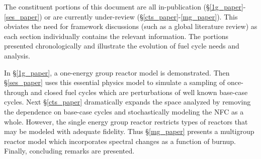 The constituent portions of this document are all in-publication (\S \ref{1g_paper}-\ref{ses_paper})
or are currently under-review (\S \ref{cts_paper}-\ref{mg_paper}).  This obviates the need
for framework discussions (such as a global literature review) as each section individually
contains the relevant information.  The portions presented chronologically and illustrate the 
evolution of fuel cycle needs and analysis.

In \S \ref{1g_paper}, a one-energy group reactor model is demonstrated.  Then \S \ref{ses_paper}
uses this essential physics model to simulate a sampling of once-through and closed fuel cycles
which are perturbations of well known base-case cycles.  Next \S \ref{cts_paper} dramatically
expands the space analyzed by removing the dependence on base-case cycles and stochastically 
modeling the NFC as a whole.  However, the single energy group reactor restricts types of reactors
that may be modeled with adequate fidelity.  Thus \S \ref{mg_paper} presents a multigroup reactor
model which incorporates spectral changes as a function of burnup.  Finally, concluding remarks
are presented.


